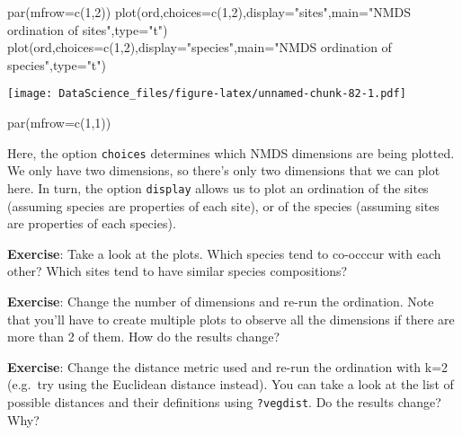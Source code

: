 \documentclass[
]{book}
\newenvironment{Shaded}{\begin{snugshade}}{\end{snugshade}}
\newcommand{\AttributeTok}[1]{\textcolor[rgb]{0.77,0.63,0.00}{#1}}
\newcommand{\DecValTok}[1]{\textcolor[rgb]{0.00,0.00,0.81}{#1}}
\newcommand{\FunctionTok}[1]{\textcolor[rgb]{0.00,0.00,0.00}{#1}}
\newcommand{\NormalTok}[1]{#1}
\newcommand{\StringTok}[1]{\textcolor[rgb]{0.31,0.60,0.02}{#1}}
\begin{document}
\begin{Shaded}
\begin{Highlighting}[]
\FunctionTok{par}\NormalTok{(}\AttributeTok{mfrow=}\FunctionTok{c}\NormalTok{(}\DecValTok{1}\NormalTok{,}\DecValTok{2}\NormalTok{))}
\FunctionTok{plot}\NormalTok{(ord,}\AttributeTok{choices=}\FunctionTok{c}\NormalTok{(}\DecValTok{1}\NormalTok{,}\DecValTok{2}\NormalTok{),}\AttributeTok{display=}\StringTok{"sites"}\NormalTok{,}\AttributeTok{main=}\StringTok{"NMDS ordination of sites"}\NormalTok{,}\AttributeTok{type=}\StringTok{"t"}\NormalTok{)}
\FunctionTok{plot}\NormalTok{(ord,}\AttributeTok{choices=}\FunctionTok{c}\NormalTok{(}\DecValTok{1}\NormalTok{,}\DecValTok{2}\NormalTok{),}\AttributeTok{display=}\StringTok{"species"}\NormalTok{,}\AttributeTok{main=}\StringTok{"NMDS ordination of species"}\NormalTok{,}\AttributeTok{type=}\StringTok{"t"}\NormalTok{)}
\end{Highlighting}
\end{Shaded}

\texttt{[image: DataScience\_files/figure-latex/unnamed-chunk-82-1.pdf]}

\begin{Shaded}
\begin{Highlighting}[]
\FunctionTok{par}\NormalTok{(}\AttributeTok{mfrow=}\FunctionTok{c}\NormalTok{(}\DecValTok{1}\NormalTok{,}\DecValTok{1}\NormalTok{))}
\end{Highlighting}
\end{Shaded}

Here, the option \texttt{choices} determines which NMDS dimensions are being plotted. We only have two dimensions, so there's only two dimensions that we can plot here. In turn, the option \texttt{display} allows us to plot an ordination of the sites (assuming species are properties of each site), or of the species (assuming sites are properties of each species).

\textbf{Exercise}: Take a look at the plots. Which species tend to co-occcur with each other? Which sites tend to have similar species compositions?

\textbf{Exercise}: Change the number of dimensions and re-run the ordination. Note that you'll have to create multiple plots to observe all the dimensions if there are more than 2 of them. How do the results change?

\textbf{Exercise}: Change the distance metric used and re-run the ordination with k=2 (e.g.~try using the Euclidean distance instead). You can take a look at the list of possible distances and their definitions using \texttt{?vegdist}. Do the results change? Why?
\end{document}
